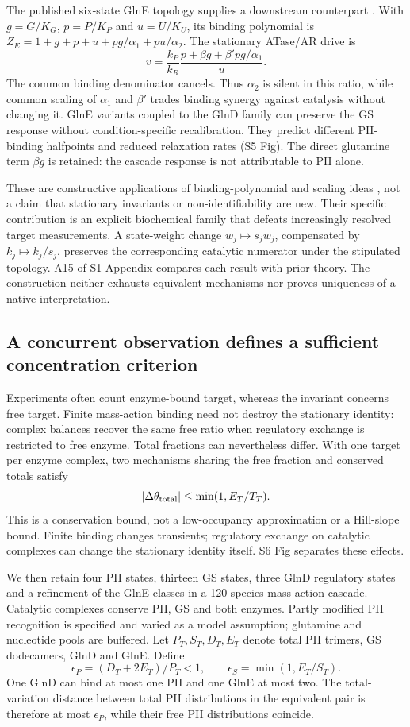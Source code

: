 \documentclass[10pt,letterpaper]{article}
\begin{document}
The published six-state GlnE topology supplies a downstream counterpart \cite{r71}. With $g=G/K_G$, $p=P/K_P$ and $u=U/K_U$, its binding polynomial is $Z_E=1+g+p+u+pg/\alpha_1+pu/\alpha_2$. The stationary ATase/AR drive is
\[
 v=\frac{k_P}{k_R}\frac{p+\beta g+\beta'pg/\alpha_1}{u}.
\]
The common binding denominator cancels. Thus $\alpha_2$ is silent in this ratio, while common scaling of $\alpha_1$ and $\beta'$ trades binding synergy against catalysis without changing it. GlnE variants coupled to the GlnD family can preserve the GS response without condition-specific recalibration. They predict different PII-binding halfpoints and reduced relaxation rates (S5 Fig). The direct glutamine term $\beta g$ is retained: the cascade response is not attributable to PII alone.

These are constructive applications of binding-polynomial and scaling ideas \cite{r4,r72,r73}, not a claim that stationary invariants or non-identifiability are new. Their specific contribution is an explicit biochemical family that defeats increasingly resolved target measurements. A state-weight change $w_j\mapsto s_jw_j$, compensated by $k_j\mapsto k_j/s_j$, preserves the corresponding catalytic numerator under the stipulated topology. A15 of S1 Appendix compares each result with prior theory. The construction neither exhausts equivalent mechanisms nor proves uniqueness of a native interpretation.

\subsection*{A concurrent observation defines a sufficient concentration criterion}

Experiments often count enzyme-bound target, whereas the invariant concerns free target. Finite mass-action binding need not destroy the stationary identity: complex balances recover the same free ratio when regulatory exchange is restricted to free enzyme. Total fractions can nevertheless differ. With one target per enzyme complex, two mechanisms sharing the free fraction and conserved totals satisfy
\[
 |\Delta\theta_{\rm total}|\leq\min(1,E_T/T_T).
\]
This is a conservation bound, not a low-occupancy approximation or a Hill-slope bound. Finite binding changes transients; regulatory exchange on catalytic complexes can change the stationary identity itself. S6 Fig separates these effects.

We then retain four PII states, thirteen GS states, three GlnD regulatory states and a refinement of the GlnE classes in a 120-species mass-action cascade. Catalytic complexes conserve PII, GS and both enzymes. Partly modified PII recognition is specified and varied as a model assumption; glutamine and nucleotide pools are buffered. Let $P_T,S_T,D_T,E_T$ denote total PII trimers, GS dodecamers, GlnD and GlnE. Define
\[
 \epsilon_P=(D_T+2E_T)/P_T<1,\qquad
 \epsilon_S=\min(1,E_T/S_T).
\]
One GlnD can bind at most one PII and one GlnE at most two. The total-variation distance between total PII distributions in the equivalent pair is therefore at most $\epsilon_P$, while their free PII distributions coincide.
\end{document}

